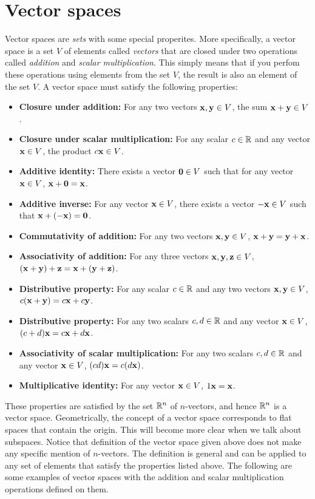 \section{Vector spaces}
Vector spaces are \textit{sets} with some special properites. More specifically, a vector space is a set $V$ of elements called \textit{vectors} that are closed under two operations called \textit{addition} and \textit{scalar multiplication}. This simply means that if you perfom these operations using elements from the set $V$, the result is also an element of the set $V$. A vector space must satisfy the following properties:
\begin{itemize}
    \item \textbf{Closure under addition:} For any two vectors $\mathbf{x}, \mathbf{y} \in V$, the sum $\mathbf{x} + \mathbf{y} \in V$.
    \item \textbf{Closure under scalar multiplication:} For any scalar $c \in \mathbb{R}$ and any vector $\mathbf{x} \in V$, the product $c\mathbf{x} \in V$.
    \item \textbf{Additive identity:} There exists a vector $\mathbf{0} \in V$ such that for any vector $\mathbf{x} \in V$, $\mathbf{x} + \mathbf{0} = \mathbf{x}$.
    \item \textbf{Additive inverse:} For any vector $\mathbf{x} \in V$, there exists a vector $-\mathbf{x} \in V$ such that $\mathbf{x} + (-\mathbf{x}) = \mathbf{0}$.
    \item \textbf{Commutativity of addition:} For any two vectors $\mathbf{x}, \mathbf{y} \in V$, $\mathbf{x} + \mathbf{y} = \mathbf{y} + \mathbf{x}$.
    \item \textbf{Associativity of addition:} For any three vectors $\mathbf{x}, \mathbf{y}, \mathbf{z} \in V$, $(\mathbf{x} + \mathbf{y}) + \mathbf{z} = \mathbf{x} + (\mathbf{y} + \mathbf{z})$.
    \item \textbf{Distributive property:} For any scalar $c \in \mathbb{R}$ and any two vectors $\mathbf{x}, \mathbf{y} \in V$, $c(\mathbf{x} + \mathbf{y}) = c\mathbf{x} + c\mathbf{y}$.
    \item \textbf{Distributive property:} For any two scalars $c, d \in \mathbb{R}$ and any vector $\mathbf{x} \in V$, $(c + d)\mathbf{x} = c\mathbf{x} + d\mathbf{x}$.
    \item \textbf{Associativity of scalar multiplication:} For any two scalars $c, d \in \mathbb{R}$ and any vector $\mathbf{x} \in V$, $(cd)\mathbf{x} = c(d\mathbf{x})$.
    \item \textbf{Multiplicative identity:} For any vector $\mathbf{x} \in V$, $1\mathbf{x} = \mathbf{x}$.
\end{itemize}
These properties are satisfied by the set $\mathbb{R}^n$ of $n$-vectors, and hence $\mathbb{R}^n$ is a vector space. Geometrically, the concept of a vector space corresponds to flat spaces that contain the origin. This will become more clear when we talk about subspaces. Notice that definition of the vector space given above does not make any specific mention of $n$-vectors. The definition is general and can be applied to any set of elements that satisfy the properties listed above. The following are some examples of vector spaces with the addition and scalar multiplication operations defined on them.

